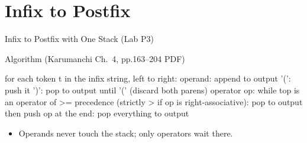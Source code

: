 \documentclass[aspectratio=169]{beamer}
\begin{document}

\section{Infix to Postfix}


\begin{frame}[fragile]{Infix to Postfix with One Stack (Lab P3)}
  \begin{block}{Algorithm (Karumanchi Ch.~4, pp.163--204 PDF)
    \cite{Karumanchi2017_data_structures_algorithms_made_easy}}
\begin{semiverbatim}
for each token t in the infix string, left to right:
    operand: append to output
    '(': push it
    ')': pop to output until '(' (discard both parens)
    operator op: while top is an operator of >= precedence
        (strictly > if op is right-associative): pop to output
        then push op
at the end: pop everything to output
\end{semiverbatim}
  \end{block}
  \begin{itemize}
    \item Operands never touch the stack; only operators wait there.
  \end{itemize}
\end{frame}
\end{document}
